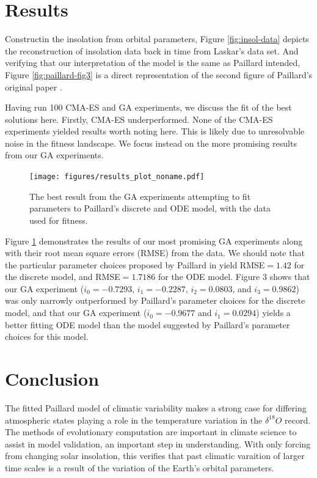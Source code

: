 \section{Results}

Constructin the insolation from orbital parameters, Figure \ref{fig:insol-data} depicts the reconstruction of insolation data back in time from Laskar's data set. And verifying that our interpretation of the model is the same as Paillard intended, Figure \ref{fig:paillard-fig3} is a direct representation of the second figure of Paillard's original paper \cite{paillard1998timing}.

Having run 100 CMA-ES and GA experiments, we discuss the fit of the best solutions here. Firstly, CMA-ES underperformed. None of the CMA-ES experiments yielded results worth noting here. This is likely due to unresolvable noise in the fitness landscape. We focus instead on the more promising results from our GA experiments.

\begin{figure}[tpb!]
\centering
  \texttt{[image: figures/results\_plot\_noname.pdf]}
  \caption{
      The best result from the GA experiments attempting to fit parameters to Paillard's discrete and ODE model, with the \DO data used for fitness.
    }
  \label{fig:results}
\end{figure}

Figure \ref{fig:results} demonstrates the results of our most promising GA experiments along with their root mean square errors (RMSE) from the \DO data. We should note that the particular parameter choices proposed by Paillard in \cite{paillard1998timing} yield RMSE$=1.42$ for the discrete model, and RMSE$=1.7186$ for the ODE model. Figure 3 shows that our GA experiment ($i_{0}= -0.7293$, $i_{1}=-0.2287$, $i_{2}=0.0803$, and $i_{3}=0.9862$) was only narrowly outperformed by Paillard's parameter choices for the discrete model, and that our GA experiment ($i_{0}= -0.9677$ and $i_{1}=0.0294$) yields a better fitting ODE model than the model suggested by Paillard's parameter choices for this model.

\section{Conclusion}

The fitted Paillard model of climatic variability makes a strong case for differing atmospheric states playing a role in the temperature variation in the $\delta ^{18} O$ record.
The methods of evolutionary computation are important in climate science to assist in model validation, an important step in understanding.
With only forcing from changing solar insolation, this verifies that past climatic varaition of larger time scales is a result of the variation of the Earth's orbital parameters.



